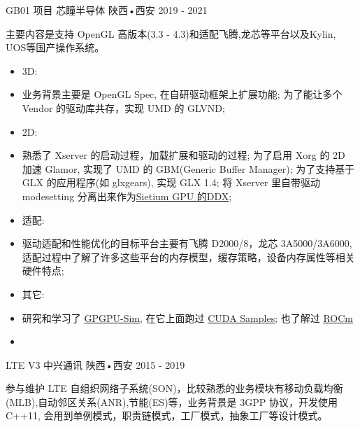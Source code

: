 \begin{cventries}
  \cventry
    {GB01 项目} %
    {芯瞳半导体} %
    {陕西•西安} %
    {2019 - 2021} %
    {
      \begin{cvitems} %
        \item {主要内容是支持 OpenGL 高版本(3.3 - 4.3)和适配飞腾,龙芯等平台以及Kylin, UOS等国产操作系统。
          \begin{itemize}
            \item 3D:
            \item[] 业务背景主要是 OpenGL Spec, 在自研驱动框架上扩展功能;\newline
               为了能让多个 Vendor 的驱动库共存，实现 UMD 的 GLVND;
            \item 2D:
            \item[]
               熟悉了 Xserver 的启动过程，加载扩展和驱动的过程;\newline
               为了启用 Xorg 的 2D 加速 Glamor, 实现了 UMD 的 GBM(Generic Buffer Manager);\newline
               为了支持基于 GLX 的应用程序(如 glxgears), 实现 GLX 1.4;\newline
               将 Xserver 里自带驱动 modesetting 分离出来作为\href{https://gitlab.freedesktop.org/freedesktop/freedesktop/-/issues/502#note_1801154}{Sietium GPU 的DDX};
            \item 适配:
            \item[] 驱动适配和性能优化的目标平台主要有飞腾 D2000/8，龙芯 3A5000/3A6000, 适配过程中了解了许多这些平台的内存模型，缓存策略，设备内存属性等相关硬件特点;
            \item 其它:
            \item[] 研究和学习了 \href{https://github.com/gpgpu-sim/gpgpu-sim_distribution}{GPGPU-Sim}, 在它上面跑过
              \href{https://lucmann.github.io/comp/run_cuda_samples_on_gpgpusim/}{CUDA Samples}; 也了解过 \href{https://lucmann.github.io/comp/rocm/}{ROCm}
            \item[]
          \end{itemize}
        }
      \end{cvitems}
    }
\end{cventries}

\begin{cventries}
  \cventry
    {LTE V3} %
    {中兴通讯} %
    {陕西•西安} %
    {2015 - 2019} %
    {
      \begin{cvitems} %
      \item {参与维护 LTE 自组织网络子系统(SON)，比较熟悉的业务模块有移动负载均衡(MLB),自动邻区关系(ANR),节能(ES)等，业务背景是 3GPP 协议，开发使用C++11,
      会用到单例模式，职责链模式，工厂模式，抽象工厂等设计模式。
      }
      \end{cvitems}
    }
\end{cventries}
